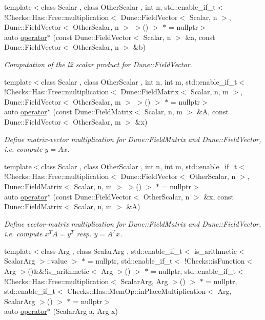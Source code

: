 \begin{DoxyCompactItemize}
{\footnotesize template$<$class Scalar , class Other\+Scalar , int n, std\+::enable\+\_\+if\+\_\+t$<$ !\+Checks\+::\+Has\+::\+Free\+::multiplication$<$ Dune\+::\+Field\+Vector$<$ Scalar, n $>$, Dune\+::\+Field\+Vector$<$ Other\+Scalar, n $>$ $>$() $>$ $\ast$  = nullptr$>$ }\\auto \hyperlink{namespaceFunG_a5e258023361844926f485229c62a733b}{operator$\ast$} (const Dune\+::\+Field\+Vector$<$ Scalar, n $>$ \&a, const Dune\+::\+Field\+Vector$<$ Other\+Scalar, n $>$ \&b)
\begin{DoxyCompactList}\small\item\em Computation of the l2 scalar product for Dune\+::\+Field\+Vector. \end{DoxyCompactList}\item 
{\footnotesize template$<$class Scalar , class Other\+Scalar , int n, int m, std\+::enable\+\_\+if\+\_\+t$<$ !\+Checks\+::\+Has\+::\+Free\+::multiplication$<$ Dune\+::\+Field\+Matrix$<$ Scalar, n, m $>$, Dune\+::\+Field\+Vector$<$ Other\+Scalar, m $>$ $>$() $>$ $\ast$  = nullptr$>$ }\\auto \hyperlink{namespaceFunG_abadb8da34a5abc3dde0107231ab91c6f}{operator$\ast$} (const Dune\+::\+Field\+Matrix$<$ Scalar, n, m $>$ \&A, const Dune\+::\+Field\+Vector$<$ Other\+Scalar, m $>$ \&x)
\begin{DoxyCompactList}\small\item\em Define matrix-\/vector multiplication for Dune\+::\+Field\+Matrix and Dune\+::\+Field\+Vector, i.\+e. compute $y=Ax$. \end{DoxyCompactList}\item 
{\footnotesize template$<$class Scalar , class Other\+Scalar , int n, int m, std\+::enable\+\_\+if\+\_\+t$<$ !\+Checks\+::\+Has\+::\+Free\+::multiplication$<$ Dune\+::\+Field\+Vector$<$ Other\+Scalar, n $>$, Dune\+::\+Field\+Matrix$<$ Scalar, n, m $>$ $>$() $>$ $\ast$  = nullptr$>$ }\\auto \hyperlink{namespaceFunG_a19a9d7b55b56f5101560034413a1dbfe}{operator$\ast$} (const Dune\+::\+Field\+Vector$<$ Other\+Scalar, n $>$ \&x, const Dune\+::\+Field\+Matrix$<$ Scalar, n, m $>$ \&A)
\begin{DoxyCompactList}\small\item\em Define vector-\/matrix multiplication for Dune\+::\+Field\+Matrix and Dune\+::\+Field\+Vector, i.\+e. compute $x^T A = y^T$ resp. $y=A^T x$. \end{DoxyCompactList}\item 
{\footnotesize template$<$class Arg , class Scalar\+Arg , std\+::enable\+\_\+if\+\_\+t$<$ is\+\_\+arithmetic$<$ Scalar\+Arg $>$\+::value $>$ $\ast$  = nullptr, std\+::enable\+\_\+if\+\_\+t$<$ !\+Checks\+::is\+Function$<$ Arg $>$()\&\&!is\+\_\+arithmetic$<$ Arg $>$() $>$ $\ast$  = nullptr, std\+::enable\+\_\+if\+\_\+t$<$ !\+Checks\+::\+Has\+::\+Free\+::multiplication$<$ Scalar\+Arg, Arg $>$() $>$ $\ast$  = nullptr, std\+::enable\+\_\+if\+\_\+t$<$ Checks\+::\+Has\+::\+Mem\+Op\+::in\+Place\+Multiplication$<$ Arg, Scalar\+Arg $>$() $>$ $\ast$  = nullptr$>$ }\\auto \hyperlink{namespaceFunG_ac71b238827eda3b6518c39e49447bdeb}{operator$\ast$} (Scalar\+Arg a, Arg x)

\end{DoxyCompactItemize}
